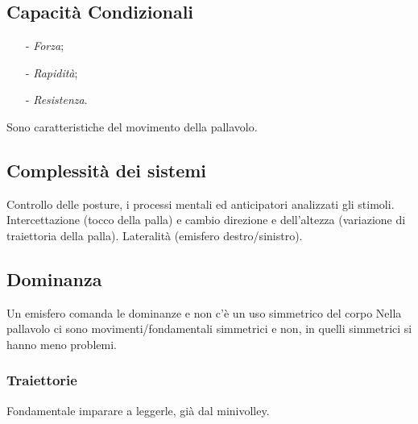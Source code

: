 \subsection{Capacità Condizionali}
\begin{itemize}
\item[-]\emph{Forza};
\item[-]\emph{Rapidità};
\item[-]\emph{Resistenza}.
\end{itemize}
Sono caratteristiche del movimento della pallavolo.


\subsection{Complessità dei sistemi}
Controllo delle posture, i processi mentali ed anticipatori analizzati gli stimoli. Intercettazione (tocco della palla) e cambio direzione e dell'altezza (variazione di traiettoria della palla). Lateralità (emisfero destro/sinistro).

\subsection{Dominanza}
Un emisfero comanda le dominanze e non c'è un uso simmetrico del corpo
Nella pallavolo ci sono movimenti/fondamentali simmetrici e non, in quelli simmetrici si hanno meno problemi.

\subsubsection{Traiettorie}
Fondamentale imparare a leggerle, già dal minivolley.

